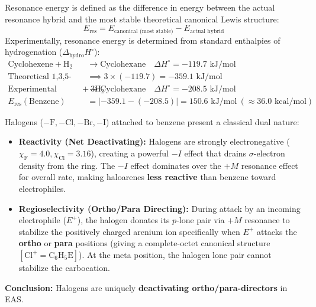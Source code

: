 \documentclass[10pt,a4paper]{article}
\begin{document}
\begin{formulabox}
Resonance energy is defined as the difference in energy between the actual resonance hybrid and the most stable theoretical canonical Lewis structure:
\begin{equation}
  E_{\mathrm{res}} = E_{\text{canonical (most stable)}} - E_{\text{actual hybrid}}
\end{equation}
Experimentally, resonance energy is determined from standard enthalpies of hydrogenation ($\Delta_{\mathrm{hydro}}H^\circ$):
\begin{equation}
  \begin{aligned}
    \text{Cyclohexene} + \mathrm{H_2} &\to \text{Cyclohexane} \quad \Delta H^\circ = -119.7\text{ kJ/mol}\\
    \text{Theoretical 1,3,5-Cyclohexatriene (no resonance)} &\implies 3 \times (-119.7) = -359.1\text{ kJ/mol}\\
    \text{Experimental Benzene} + 3\mathrm{H_2} &\to \text{Cyclohexane} \quad \Delta H^\circ = -208.5\text{ kJ/mol}\\
    E_{\mathrm{res}}(\text{Benzene}) &= |-359.1 - (-208.5)| = 150.6\text{ kJ/mol} \ (\approx 36.0\text{ kcal/mol})
  \end{aligned}
\end{equation}
\end{formulabox}

\begin{trapbox}
Halogens ($-\mathrm{F}, -\mathrm{Cl}, -\mathrm{Br}, -\mathrm{I}$) attached to benzene present a classical dual nature:
\begin{itemize}
  \item \textbf{Reactivity (Net Deactivating):} Halogens are strongly electronegative ($\chi_{\mathrm{F}} = 4.0, \chi_{\mathrm{Cl}} = 3.16$), creating a powerful $-I$ effect that drains $\sigma$-electron density from the ring. The $-I$ effect dominates over the $+M$ resonance effect for overall rate, making haloarenes \textbf{less reactive} than benzene toward electrophiles.
  \item \textbf{Regioselectivity (Ortho/Para Directing):} During attack by an incoming electrophile ($E^+$), the halogen donates its $p$-lone pair via $+M$ resonance to stabilize the positively charged arenium ion specifically when $E^+$ attacks the \textbf{ortho} or \textbf{para} positions (giving a complete-octet canonical structure $[\mathrm{Cl}^+=\mathrm{C_6H_5E}]$). At the meta position, the halogen lone pair cannot stabilize the carbocation.
\end{itemize}
\textbf{Conclusion:} Halogens are uniquely \textbf{deactivating ortho/para-directors} in EAS.
\end{trapbox}
\end{document}
